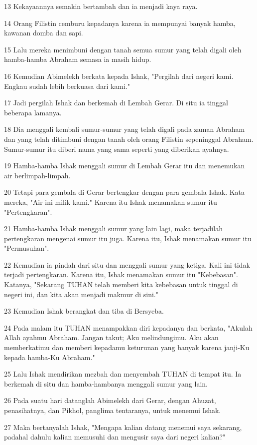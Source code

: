 \par 13 Kekayaannya semakin bertambah dan ia menjadi kaya raya.
\par 14 Orang Filistin cemburu kepadanya karena ia mempunyai banyak hamba, kawanan domba dan sapi.
\par 15 Lalu mereka menimbuni dengan tanah semua sumur yang telah digali oleh hamba-hamba Abraham semasa ia masih hidup.
\par 16 Kemudian Abimelekh berkata kepada Ishak, "Pergilah dari negeri kami. Engkau sudah lebih berkuasa dari kami."
\par 17 Jadi pergilah Ishak dan berkemah di Lembah Gerar. Di situ ia tinggal beberapa lamanya.
\par 18 Dia menggali kembali sumur-sumur yang telah digali pada zaman Abraham dan yang telah ditimbuni dengan tanah oleh orang Filistin sepeninggal Abraham. Sumur-sumur itu diberi nama yang sama seperti yang diberikan ayahnya.
\par 19 Hamba-hamba Ishak menggali sumur di Lembah Gerar itu dan menemukan air berlimpah-limpah.
\par 20 Tetapi para gembala di Gerar bertengkar dengan para gembala Ishak. Kata mereka, "Air ini milik kami." Karena itu Ishak menamakan sumur itu "Pertengkaran".
\par 21 Hamba-hamba Ishak menggali sumur yang lain lagi, maka terjadilah pertengkaran mengenai sumur itu juga. Karena itu, Ishak menamakan sumur itu "Permusuhan".
\par 22 Kemudian ia pindah dari situ dan menggali sumur yang ketiga. Kali ini tidak terjadi pertengkaran. Karena itu, Ishak menamakan sumur itu "Kebebasan". Katanya, "Sekarang TUHAN telah memberi kita kebebasan untuk tinggal di negeri ini, dan kita akan menjadi makmur di sini."
\par 23 Kemudian Ishak berangkat dan tiba di Bersyeba.
\par 24 Pada malam itu TUHAN menampakkan diri kepadanya dan berkata, "Akulah Allah ayahmu Abraham. Jangan takut; Aku melindungimu. Aku akan memberkatimu dan memberi kepadamu keturunan yang banyak karena janji-Ku kepada hamba-Ku Abraham."
\par 25 Lalu Ishak mendirikan mezbah dan menyembah TUHAN di tempat itu. Ia berkemah di situ dan hamba-hambanya menggali sumur yang lain.
\par 26 Pada suatu hari datanglah Abimelekh dari Gerar, dengan Ahuzat, penasihatnya, dan Pikhol, panglima tentaranya, untuk menemui Ishak.
\par 27 Maka bertanyalah Ishak, "Mengapa kalian datang menemui saya sekarang, padahal dahulu kalian memusuhi dan mengusir saya dari negeri kalian?"

